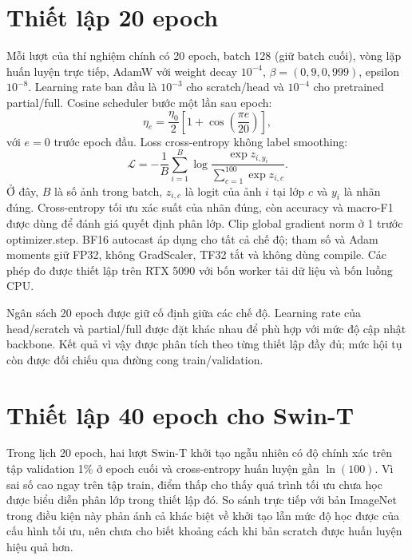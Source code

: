 \documentclass[12pt,a4paper]{report}
\begin{document}
\section{Thiết lập 20 epoch}
Mỗi lượt của thí nghiệm chính có 20 epoch, batch 128 (giữ batch cuối), vòng lặp huấn luyện trực tiếp,
AdamW với weight decay $10^{-4}$, $\beta=(0{,}9,0{,}999)$, epsilon $10^{-8}$.
Learning rate ban đầu là $10^{-3}$ cho scratch/head và $10^{-4}$ cho
pretrained partial/full. Cosine scheduler bước một lần sau epoch:
\begin{equation}
\eta_e=\frac{\eta_0}{2}\left[1+\cos\left(\frac{\pi e}{20}\right)\right],
\end{equation}
với $e=0$ trước epoch đầu. Loss cross-entropy không label smoothing:
\begin{equation}
\mathcal{L}=-\frac1B\sum_{i=1}^{B}\log
\frac{\exp z_{i,y_i}}{\sum_{c=1}^{100}\exp z_{i,c}}.
\end{equation}
Ở đây, $B$ là số ảnh trong batch, $z_{i,c}$ là logit của ảnh $i$ tại lớp $c$ và $y_i$ là nhãn đúng. Cross-entropy tối ưu xác suất của nhãn đúng, còn accuracy và macro-F1 được dùng để đánh giá quyết định phân lớp.
Clip global gradient norm ở 1 trước optimizer.step. BF16 autocast áp dụng
cho tất cả chế độ; tham số và Adam moments giữ FP32, không GradScaler,
TF32 tắt và không dùng compile. Các phép đo được thiết lập trên RTX 5090 với
bốn worker tải dữ liệu và bốn luồng CPU.

Ngân sách 20 epoch được giữ cố định giữa các chế độ. Learning rate của
head/scratch và partial/full được đặt khác nhau để phù hợp với mức độ cập
nhật backbone. Kết quả vì vậy được phân tích theo từng thiết lập đầy đủ;
mức hội tụ còn được đối chiếu qua đường cong train/validation.

\section{Thiết lập 40 epoch cho Swin-T}

Trong lịch 20 epoch, hai lượt Swin-T khởi tạo ngẫu nhiên có độ chính xác trên tập validation
1\% ở epoch cuối và cross-entropy huấn luyện gần $\ln(100)$. Vì sai số cao
ngay trên tập train, điểm thấp cho thấy quá trình tối ưu chưa học được
biểu diễn phân lớp trong thiết lập đó. So sánh trực tiếp với bản ImageNet
trong điều kiện này phản ánh cả khác biệt về khởi tạo lẫn mức độ học được của cấu hình tối ưu, nên chưa cho biết khoảng cách khi bản scratch được huấn luyện hiệu quả hơn.
\end{document}
